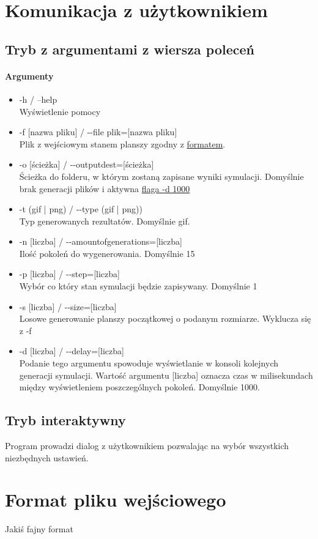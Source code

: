 \documentclass{report}
\begin{document}
\section{Komunikacja z użytkownikiem}

\subsection{Tryb z argumentami z wiersza poleceń}
\paragraph{Argumenty}
\begin{itemize}
\item -h / --help \\ Wyświetlenie pomocy
\item -f [nazwa pliku]  / -{}-file plik=[nazwa pliku] \\ Plik z wejściowym stanem planszy zgodny z \hyperref[format]{\textcolor{LinkColor}{formatem}}. %
\item -o [ścieżka] / -{}-output\textunderscore{}dest=[ścieżka]  \\Ścieżka do folderu, w którym zostaną zapisane wyniki symulacji. Domyślnie brak generacji plików i aktywna \hyperref[delay]{\textcolor{LinkColor}{flaga -d 1000}}
\item -t (gif | png) / -{}-type (gif | png)) \\Typ generowanych rezultatów. Domyślnie gif.
\item -n [liczba] / -{}-amount\textunderscore{}of\textunderscore{}generations=[liczba] \\ Ilość pokoleń do wygenerowania. Domyślnie 15
\item -p [liczba] / -{}-step=[liczba] \\ Wybór co który stan symulacji będzie zapisywany. Domyślnie 1
\item -s [liczba] / -{}-size=[liczba] \\ Losowe generowanie planszy początkowej o podanym rozmiarze. Wyklucza się z -f
\item \label{delay} -d [liczba] / -{}-delay=[liczba] \\ Podanie tego argumentu spowoduje wyświetlanie w konsoli kolejnych generacji symulacji. Wartość argumentu [liczba] oznacza czas  w milisekundach między wyświetleniem poszczególnych pokoleń. Domyślnie 1000.
\end{itemize}

\subsection{Tryb interaktywny}
Program prowadzi dialog z użytkownikiem pozwalając na wybór wszystkich niezbędnych ustawień.

\section{Format pliku wejściowego} 
\label{format}
Jakiś fajny format
\end{document}
